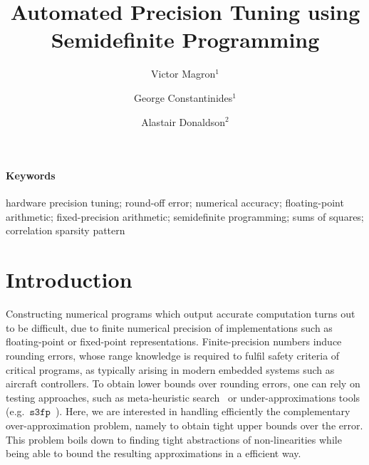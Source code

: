 \documentclass[a4paper,10pt]{article}
\title{\bf Automated Precision Tuning using Semidefinite Programming}
\newcommand{\sthreefp}{\mathtt{s3fp}}
\theoremstyle{plain}
\theoremstyle{definition}
\theoremstyle{remark}
\begin{document}
\author{Victor Magron$^{1}$ \and George Constantinides$^{1}$ \and Alastair Donaldson$^{2}$}


\maketitle

\begin{abstract}
\end{abstract}
\paragraph{Keywords}
hardware precision tuning; round-off error; numerical accuracy; floating-point arithmetic; fixed-precision arithmetic; semidefinite programming; sums of squares; correlation sparsity pattern
\section{Introduction} %
%
Constructing numerical programs which output accurate computation turns out to be difficult, due to finite numerical precision of implementations such as floating-point or fixed-point representations. Finite-precision numbers induce rounding errors, whose range knowledge is required to fulfil safety criteria of critical programs, as typically arising in modern embedded systems such as aircraft controllers.
To obtain lower bounds over rounding errors, one can rely on testing approaches, such as meta-heuristic search~\cite{Borges12Test} or under-approximations tools (e.g.~$\sthreefp$~\cite{Chiang14s3fp}). Here, we are interested in handling efficiently the complementary over-approximation problem, namely to obtain tight upper bounds over the error. This problem boils down to finding tight abstractions of non-linearities while being able to bound the resulting approximations in a efficient way.  
%
\end{document}
